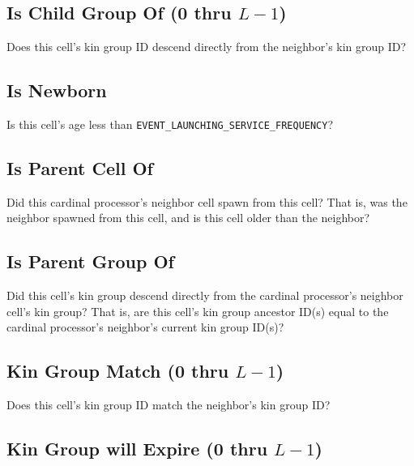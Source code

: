 \subsection{Is Child Group Of (0 thru $L-1$)}


Does this cell's kin group ID descend directly from the neighbor's kin group ID?

\subsection{Is Newborn}


Is this cell's age less than \texttt{EVENT\_LAUNCHING\_SERVICE\_FREQUENCY}?

\subsection{Is Parent Cell Of}


Did this cardinal processor's neighbor cell spawn from this cell?
That is, was the neighbor spawned from this cell, and is this cell older than the neighbor?

\subsection{Is Parent Group Of}


Did this cell's kin group descend directly from the cardinal processor's neighbor cell's kin group?
That is, are this cell's kin group ancestor ID(s) equal to the cardinal processor's neighbor's current kin group ID(s)?

\subsection{Kin Group Match (0 thru $L-1$)}


Does this cell's kin group ID match the neighbor's kin group ID?

\subsection{Kin Group will Expire (0 thru $L-1$)}

